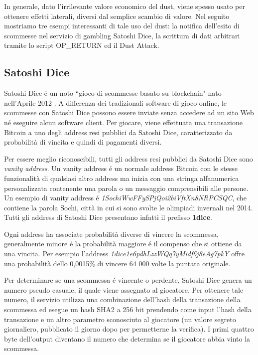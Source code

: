 In generale, dato l'irrilevante valore economico del dust, viene spesso usato per ottenere effetti laterali, diversi dal semplice scambio di valore. Nel seguito mostriamo tre esempi interessanti di tale uso del dust: la notifica dell'esito di scommesse nel servizio di gambling Satoshi Dice, la scrittura di dati arbitrari tramite lo script OP\_RETURN ed il Dust Attack.

\subsection{Satoshi Dice}
Satoshi Dice é un noto ``gioco di scommesse basato su blockchain" nato nell'Aprile 2012 \cite{SD}. A differenza dei tradizionali software di gioco online, le scommesse con Satoshi Dice possono essere inviate senza accedere ad un sito Web né eseguire alcun software client. Per giocare, viene effettuata una transazione Bitcoin a uno degli address resi pubblici da Satoshi Dice, caratterizzato da probabilità di vincita e quindi di pagamenti diversi.

Per essere meglio riconoscibili, tutti gli address resi pubblici da Satoshi Dice sono \emph{vanity address}. Un vanity address é un normale address Bitcoin con le stesse funzionalità di qualsiasi altro address ma inizia con una stringa alfanumerica personalizzata contenente una parola o un messaggio comprensibili alle persone. Un esempio di vanity address é \textit{1SochiWwFFySPjQoi2biVftXn8NRPCSQC}, che contiene la parola Sochi, città in cui si sono svolte le olimpiadi invernali nel 2014. Tutti gli address di Satoshi Dice presentano infatti il prefisso \textbf{1dice}.

Ogni address ha associate probabilità diverse di vincere la scommessa, generalmente minore é la probabilità maggiore é il compenso che si ottiene da una vincita. Per esempio l'address \textit{1dice1e6pdhLzzWQq7yMidf6j8eAg7pkY} offre una probabilità dello 0,0015\% di vincere 64 000 volte la puntata originale.

Per determinare se una scommessa é vincente o perdente, Satoshi Dice genera un numero pseudo casuale, il quale viene assegnato al giocatore. Per ottenere tale numero, il servizio utilizza una combinazione dell'hash della transazione della scommessa ed esegue un hash SHA2 a 256 bit prendendo come input l'hash della transazione e un altro parametro sconosciuto al giocatore (un valore segreto giornaliero, pubblicato il giorno dopo per permetterne la verifica). I primi quattro byte dell'output diventano il numero che determina se il giocatore abbia vinto la scommessa.

